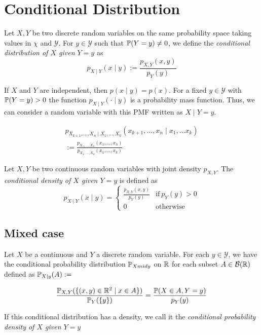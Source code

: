 \section{Conditional Distribution}
\begin{ddefinition*}
  Let \(X, Y\) be two discrete random variables on the same probability space taking values in \(\chi\) and \(\mathcal{Y}\). For \(y \in \mathcal{Y}\) such that \(\P(Y = y) \neq 0\), we define the \textit{conditional distribution of \(X\) given \(Y = y\)} as
  \[p_{X \mid Y}(x \mid y) := \frac{p_{X, Y}(x, y)}{p_Y(y)}\]
\end{ddefinition*}

If \(X\) and \(Y\) are independent, then \(p(x \mid y) = p(x)\). For a fixed \(y \in \mathcal{Y}\) with \(\P(Y = y) > 0\) the function \(p_{X \mid Y}(\cdot \mid y)\) is a probability mass function. Thus, we can consider a random variable with this PMF written as \(X \mid Y = y\).

\begin{dtheorem*}
  \vspace*{-18pt}
  \begin{multline*}
    p_{X_{k+1}, \ldots, X_n \mid X_1, \ldots, X_k}(x_{k+1}, \ldots, x_n \mid x_1, \ldots x_k) \\
    := \frac{p_{X_1, \ldots, X_n}(x_1, \ldots, x_n)}{p_{X_1, \ldots, X_k}(x_1, \ldots, x_k)}
  \end{multline*}
\end{dtheorem*}

\begin{cdefinition*}
  Let \(X, Y\) be two continuous random variables with joint density \(p_{X, Y}\). The \textit{conditional density of \(X\) given \(Y = y\)} is defined as
  \[p_{X \mid Y}(x \mid y) = \begin{cases}
    \frac{p_{X, Y}(x, y)}{p_Y(y)} & \text{if} \ p_Y(y) > 0 \\
    0 & \text{otherwise}
  \end{cases}\]
\end{cdefinition*}

\subsection{Mixed case}
\begin{definition*}
  Let \(X\) be a continuous and \(Y\) a discrete random variable. For each \(y \in \mathcal{Y}\), we have the conditional probability distribution \(\P_{X 
  mid y}\) on \(\R\) for each subset \(A \in \B(\R)\) defined as \(\P_{X \mid y}(A) :=\)
  
  \vspace{-15pt}
  \[\frac{\P_{X, Y}(\{(x, y) \in \R^2 \mid x \in A\})}{\P_Y(\{y\})} = \frac{\P(X \in A, Y = y)}{p_Y(y)}\]
  
  If this conditional distribution has a density, we call it the \textit{conditional probability density of \(X\) given \(Y = y\)}
\end{definition*}


